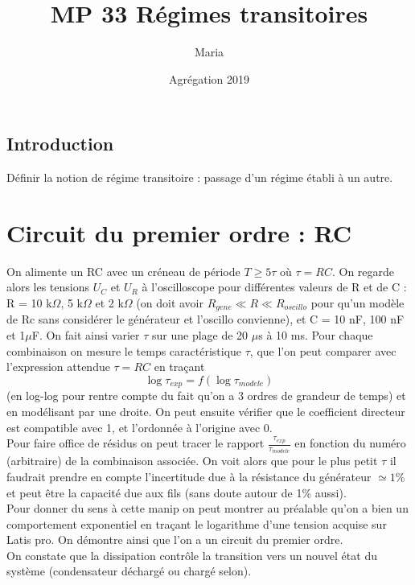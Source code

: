 \documentclass[12pt,prb,aps,epsf]{article}
\begin{document}
	
	\title{MP 33 Régimes transitoires}
	\author{Maria}
	\date{Agrégation 2019}
	
	\maketitle
	
	\tableofcontents
	
	\pagebreak
	
\subsection{Introduction}
Définir la notion de régime transitoire : passage d'un régime établi à un autre.

\section{Circuit du premier ordre : RC}
On alimente un RC avec un créneau de période $T\geq 5\tau$ où $\tau = RC$. On regarde alors les tensions $U_C$ et $U_R$ à l'oscilloscope pour différentes valeurs de R et de C : R = 10 k$\Omega$, 5 k$\Omega$ et 2 k$\Omega$ (on doit avoir $R_{gene}\ll R \ll R_{oscillo}$ pour qu'un modèle de Rc sans considérer le générateur et l'oscillo convienne), et C = 10 nF, 100 nF et 1$\mu$F. On fait ainsi varier $\tau$ sur une plage de 20 $\mu$s  à 10 ms. Pour chaque combinaison on mesure le temps caractéristique $\tau$, que l'on peut comparer avec l'expression attendue $\tau =RC$ en traçant 
\begin{equation}
\log \tau_{exp} = f(\log \tau_{modele})
\end{equation}
(en log-log pour rentre compte du fait qu'on a 3 ordres de grandeur de temps) et en modélisant par une droite. On peut ensuite vérifier que le coefficient directeur est compatible avec 1, et l'ordonnée à l'origine avec 0.\\

Pour faire office de résidus on peut tracer le rapport $\frac{\tau_{exp}}{\tau_{modele}}$ en fonction du numéro (arbitraire) de la combinaison associée. On voit alors que pour le plus petit $\tau$ il faudrait prendre en compte l'incertitude due à la résistance du générateur $\simeq 1\%$ et peut être la capacité due aux fils (sans doute autour de 1\% aussi).\\

Pour donner du sens à cette manip on peut montrer au préalable qu'on a bien un comportement exponentiel en traçant le logarithme d'une tension acquise sur Latis pro. On démontre ainsi que l'on a un circuit du premier ordre.\\
On constate que la dissipation contrôle la transition vers un nouvel état du système (condensateur déchargé ou chargé selon).\\
\end{document}
